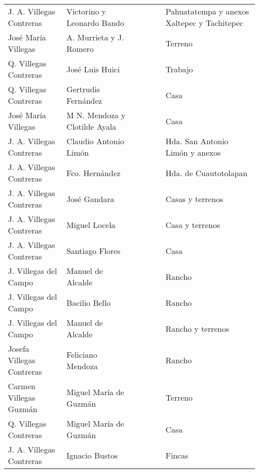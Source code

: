 \documentclass[14pt,twoside,final]{extbook} %
\begin{document}
{\begin{longtable}[c]{@{}p{2.5cm}lrSrrl@{}}
J. A. Villegas Contreras & Victorino y Leonardo Bando &  &  &  &  & Pahuatatempa y anexos Xaltepec y Tachitepec \\
José María Villegas & A. Murrieta y J. Romero &  & & & & Terreno \\
Q. Villegas Contreras & José Luis Huici &  & & & & Trabajo \\
Q. Villegas Contreras & Gertrudis Fernández &  &  &  &  & Casa \\
José María Villegas & M N. Mendoza y Clotilde Ayala &  &  &  &  & Casa \\
J. A. Villegas Contreras & Claudio Antonio Limón &  & &  &  & Hda. San Antonio Limón y anexos \\
J. A. Villegas Contreras & Fco. Hernández &  &  &  &  & Hda. de Cuautotolapan \\
J. A. Villegas Contreras & José Gandara &  &  &  &  & Casas y terrenos \\
J. A. Villegas Contreras & Miguel Locela &  &  &  &  & Casa y terrenos \\
J. A. Villegas Contreras & Santiago Flores &  &  &  &  & Casa \\
J. Villegas del Campo & Manuel de Alcalde &  & &  &  & Rancho \\
J. Villegas del Campo & Bacilio Bello &  &  & {} & {} & Rancho \\
J. Villegas del Campo & Manuel de Alcalde &  &  &  &  & Rancho y terrenos \\
Josefa Villegas Contreras & Feliciano Mendoza &  &  & {} & {} & Rancho \\
Carmen Villegas Guzmán & Miguel María de Guzmán &  & {} & {} & {} & Terreno \\
Q. Villegas Contreras & Miguel María de Guzmán &  &  & {} & {} & Casa \\
J. A. Villegas Contreras & Ignacio Bustos &  &  &  &  & Fincas \\

\end{longtable}}
\end{document}
